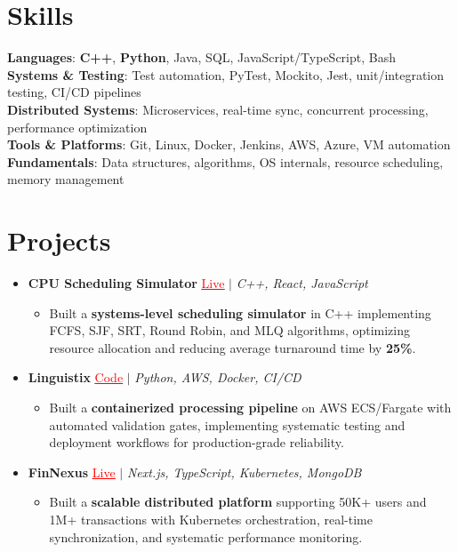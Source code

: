 \documentclass[letterpaper,10pt]{article}
\newcommand{\resumeItem}[1]{\item\small{{#1 \vspace{-2pt}}}}
\newcommand{\resumeProjectHeading}[1]{\item \small #1 \vspace{-2pt}}
\newcommand{\resumeSubHeadingListStart}{\begin{itemize}[leftmargin=0.0in, label={}]}
\newcommand{\resumeSubHeadingListEnd}{\end{itemize}}
\newcommand{\resumeProjItemListStart}{\begin{itemize}[leftmargin=0.15in,label=\textbullet,itemsep=0pt,topsep=0pt,parsep=0pt,partopsep=0pt]}
\newcommand{\resumeProjItemListEnd}{\end{itemize}\vspace{-4pt}}
\begin{document}
\section{Skills}
\begin{itemize}[leftmargin=0.15in, label={}]
\small{\item{
\textbf{Languages}: \textbf{C++}, \textbf{Python}, Java, SQL, JavaScript/TypeScript, Bash \\
\textbf{Systems \& Testing}: Test automation, PyTest, Mockito, Jest, unit/integration testing, CI/CD pipelines \\
\textbf{Distributed Systems}: Microservices, real-time sync, concurrent processing, performance optimization \\
\textbf{Tools \& Platforms}: Git, Linux, Docker, Jenkins, AWS, Azure, VM automation \\
\textbf{Fundamentals}: Data structures, algorithms, OS internals, resource scheduling, memory management
}}
\end{itemize}
\vspace{-16pt}
\section{Projects}
\resumeSubHeadingListStart
\vspace{-2pt}
\resumeProjectHeading{\textbf{CPU Scheduling Simulator} {\href{https://cpu-scheduler-amber.vercel.app/}{\textcolor{red}{\underline{Live}}}} $|$ \emph{C++, React, JavaScript}}
\resumeProjItemListStart
\resumeItem{Built a \textbf{systems-level scheduling simulator} in C++ implementing FCFS, SJF, SRT, Round Robin, and MLQ algorithms, optimizing resource allocation and reducing average turnaround time by \textbf{25\%}.}
\resumeProjItemListEnd
\vspace{3pt}
\resumeProjectHeading{\textbf{Linguistix} {\href{https://github.com/SAHAJ-BHADJA/Linguistix}{\textcolor{red}{\underline{Code}}}} $|$ \emph{Python, AWS, Docker, CI/CD}}
\resumeProjItemListStart
\resumeItem{Built a \textbf{containerized processing pipeline} on AWS ECS/Fargate with automated validation gates, implementing systematic testing and deployment workflows for production-grade reliability.}
\resumeProjItemListEnd
\vspace{3pt}
\resumeProjectHeading{\textbf{FinNexus} {\href{https://fin-nexus.vercel.app/}{\textcolor{red}{\underline{Live}}}} $|$ \emph{Next.js, TypeScript, Kubernetes, MongoDB}}
\resumeProjItemListStart
\resumeItem{Built a \textbf{scalable distributed platform} supporting 50K+ users and 1M+ transactions with Kubernetes orchestration, real-time synchronization, and systematic performance monitoring.}
\resumeProjItemListEnd
\resumeSubHeadingListEnd
\end{document}
